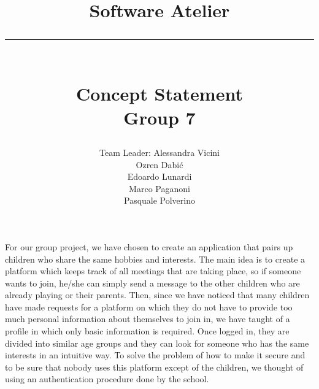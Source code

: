 \documentclass[12pt]{report}
\author{
        Team Leader: Alessandra Vicini\\
        Ozren Dabić\\
        Edoardo Lunardi\\
        Marco Paganoni\\
        Pasquale Polverino}
\title{
      Software Atelier\\\rule{5in}{0.1pt}\\
      \large Concept Statement\\
       Group 7}
\begin{document}
\maketitle
\pagestyle{empty}
For our group project, we have chosen to create an application that pairs up
children who share the same hobbies and interests. The main idea is to create
a platform which keeps track of all meetings that
are taking place, so if someone wants to join, he/she can simply send a
message to the other children who are already playing or their parents.
\newline
Then, since we have noticed that many children have made requests for a
platform on which they do not have to provide too much personal information
about themselves to join in, we have taught of a profile in which only basic
information is required. Once logged in, they are divided into similar age
groups and they can look for someone who has the same interests in an
intuitive way. To solve the problem of how to make it secure and to
be sure that nobody uses this platform except of the children, we thought
of using an authentication procedure done by the school.
\end{document}
